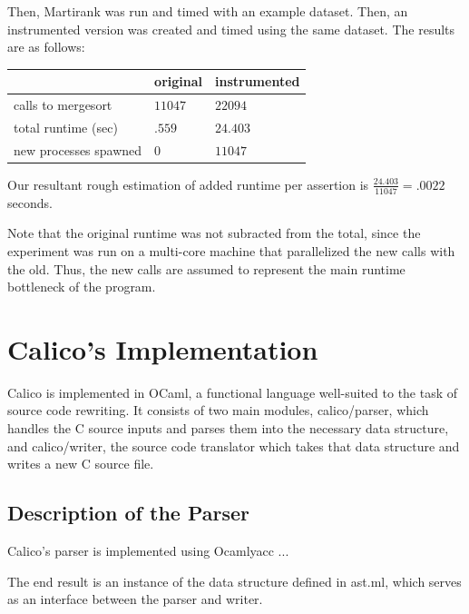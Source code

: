 \documentclass[notitlepage]{article}
\begin{document}
Then, Martirank was run and timed with an example dataset. Then, an instrumented version was created and timed using the same dataset. The results are as follows:

\begin{tabular}{l | l | l}
& original & instrumented \\ \hline
calls to mergesort & $11047$ & $22094$ \\
total runtime (sec) & $.559$ & $24.403$ \\
new processes spawned & 0 & $11047$
\end{tabular}

Our resultant rough estimation of added runtime per assertion is $\frac{24.403}{11047} = {\mathbf .0022}$ seconds.

Note that the original runtime was not subracted from the total, since the experiment was run on a multi-core machine that parallelized the new calls with the old. Thus, the new calls are assumed to represent the main runtime bottleneck of the program.

\section{Calico's Implementation}

Calico is implemented in OCaml, a functional language well-suited to the task of source code rewriting. It consists of two main modules, calico/parser, which handles the C source inputs and parses them into the necessary data structure, and calico/writer, the source code translator which takes that data structure and writes a new C source file.

\subsection{Description of the Parser}

Calico's parser is implemented using Ocamlyacc ... %

The end result is an instance of the data structure defined in ast.ml, which serves as an interface between the parser and writer.


\end{document}
